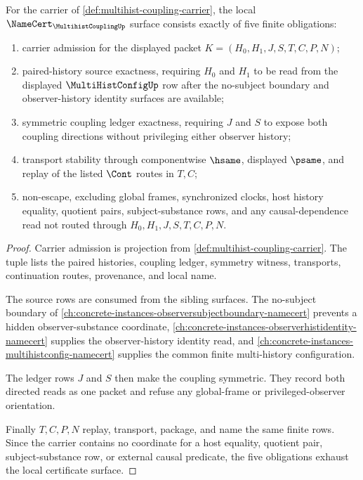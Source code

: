 \begin{theorem}
\label{thm:multihist-coupling-namecert-obligations}
For the carrier of \autoref{def:multihist-coupling-carrier}, the local $\NameCert_{\MultihistCouplingUp}$ surface consists exactly of five finite obligations:
\begin{enumerate}
\item carrier admission for the displayed packet $K=(H_0,H_1,J,S,T,C,P,N)$;
\item paired-history source exactness, requiring $H_0$ and $H_1$ to be read from the displayed $\MultiHistConfigUp$ row after the no-subject boundary and observer-history identity surfaces are available;
\item symmetric coupling ledger exactness, requiring $J$ and $S$ to expose both coupling directions without privileging either observer history;
\item transport stability through componentwise $\hsame$, displayed $\psame$, and replay of the listed $\Cont$ routes in $T,C$;
\item non-escape, excluding global frames, synchronized clocks, host history equality, quotient pairs, subject-substance rows, and any causal-dependence read not routed through $H_0,H_1,J,S,T,C,P,N$.
\end{enumerate}
\end{theorem}
\begin{proof}
Carrier admission is projection from \autoref{def:multihist-coupling-carrier}. The tuple lists the paired histories, coupling ledger, symmetry witness, transports, continuation routes, provenance, and local name.

The source rows are consumed from the sibling surfaces. The no-subject boundary of \autoref{ch:concrete-instances-observersubjectboundary-namecert} prevents a hidden observer-substance coordinate, \autoref{ch:concrete-instances-observerhistidentity-namecert} supplies the observer-history identity read, and \autoref{ch:concrete-instances-multihistconfig-namecert} supplies the common finite multi-history configuration.

The ledger rows $J$ and $S$ then make the coupling symmetric. They record both directed reads as one packet and refuse any global-frame or privileged-observer orientation.

Finally $T,C,P,N$ replay, transport, package, and name the same finite rows. Since the carrier contains no coordinate for a host equality, quotient pair, subject-substance row, or external causal predicate, the five obligations exhaust the local certificate surface.
\end{proof}

